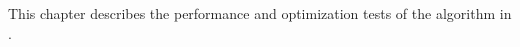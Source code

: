 This chapter describes
  the performance and optimization tests
  of the \corn{} algorithm in \dsea{}.
